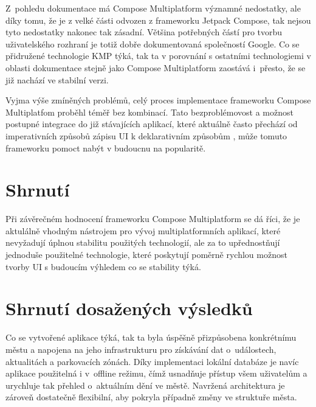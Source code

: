 

Z~pohledu dokumentace má Compose Multiplatform významné nedostatky, ale díky tomu, že je z velké části odvozen z frameworku Jetpack Compose,
tak nejsou tyto nedostatky nakonec tak zásadní. Většina potřebných částí pro tvorbu uživatelského rozhraní je totiž dobře dokumentovaná 
společností Google. Co se přidružené technologie KMP týká, tak ta v porovnání s ostatními technologiemi v oblasti dokumentace stejně jako Compose 
Multiplatform zaostává i~přesto, že se již nachází ve stabilní verzi.

Vyjma výše zmíněných problémů, celý proces implementace frameworku Compose Multiplatfom proběhl téměř bez kombinací. Tato bezproblémovost 
a možnost postupné integrace do již stávajících aplikací, které aktuálně často přechází od imperativních způsobů zápisu UI k deklarativním způsobům \cite{declarativeUIHistory},
může tomuto frameworku pomoct nabýt v budoucnu na popularitě. 

\section*{Shrnutí}
Při závěrečném hodnocení frameworku Compose Multiplatform se dá říci, že je aktulálně vhodným nástrojem pro vývoj multiplatformních 
aplikací, které nevyžadují úplnou stabilitu použitých technologií, ale za to upřednostňují jednoduše použitelné technologie, které 
poskytují poměrně rychlou možnost tvorby UI s budoucím výhledem co se stability týká.


\section{Shrnutí dosažených výsledků}
Co se vytvořené aplikace týká, tak ta byla úspěšně přizpůsobena konkrétnímu městu a napojena na jeho infrastrukturu pro získávání dat 
o~událostech, aktualitách a parkovacích zónách. Díky implementaci lokální databáze je navíc aplikace použitelná i v~offline režimu, čímž 
usnadňuje přístup všem uživatelům a urychluje tak přehled o~aktuálním dění ve městě. Navržená architektura je zároveň dostatečně flexibilní, 
aby pokryla případně změny ve struktuře města.

